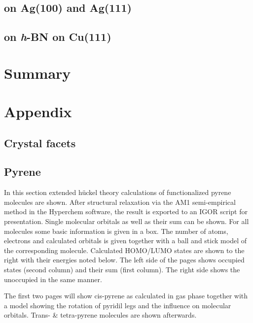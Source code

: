 \documentclass[
twoside,				%
BCOR=8mm,				%
headings=normal,		%
headsepline,			%
footsepline,			%
plainfootsepline,		%
]{scrbook}
\begin{document}
\section{on Ag(100) and Ag(111)}
\section{on \textit{h}-BN on Cu(111)}

\chapter{Summary}
      
\backmatter{}
  \printbibliography  
\chapter{Appendix}
%  
\section{Crystal facets}
  
\section{Pyrene}
In this section extended hückel theory calculations of functionalized pyrene molecules are shown. After structural relaxation via the AM1 semi-empirical method in the Hyperchem software, the result is exported to an IGOR script for presentation. Single molecular orbitals as well as their sum can be shown. For all molecules some basic information is given in a box. The number of atoms, electrons and calculated orbitals is given together with a ball and stick model of the corresponding molecule. Calculated HOMO/LUMO states are shown to the right with their energies noted below.
The left side of the pages shows occupied states (second column) and their sum (first column). The right side shows the unoccupied in the same manner.

The first two pages will show cis-pyrene as calculated in gas phase together with a model showing the rotation of pyridil legs and the influence on molecular orbitals. Trans- \& tetra-pyrene molecules are shown afterwards.
\end{document}
